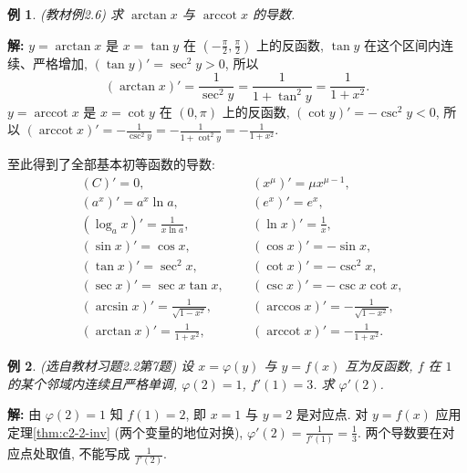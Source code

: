 \documentclass[UTF8,openany]{ctexbook}
\theoremstyle{chinesetextbook}
\newtheorem{example}{例}[section]
\newenvironment{cnsolution}{\par\indent\textbf{解:} \ignorespaces}{\par}
\begin{document}
\begin{example}\label{ex:c2-2-6}
\textnormal{(教材例2.6)} 求 $\arctan x$ 与 $\operatorname{arccot}x$ 的导数.
\end{example}
\begin{cnsolution}
$y=\arctan x$ 是 $x=\tan y$ 在 $\displaystyle\left(-\frac\pi2,\frac\pi2\right)$ 上的反函数, $\tan y$ 在这个区间内连续、严格增加, $(\tan y)'=\sec^2y>0$, 所以
\[
(\arctan x)'=\frac1{\sec^2y}=\frac1{1+\tan^2y}=\frac1{1+x^2}.
\]
$y=\operatorname{arccot}x$ 是 $x=\cot y$ 在 $(0,\pi)$ 上的反函数, $(\cot y)'=-\csc^2y<0$, 所以 $\displaystyle(\operatorname{arccot}x)'=-\frac1{\csc^2y}=-\frac1{1+\cot^2y}=-\frac1{1+x^2}$.
\end{cnsolution}
至此得到了全部基本初等函数的导数:
\[
\begin{aligned}
&(C)'=0, &&(x^\mu)'=\mu x^{\mu-1},\\
&(a^x)'=a^x\ln a, &&(e^x)'=e^x,\\
&(\log_ax)'=\frac1{x\ln a}, &&(\ln x)'=\frac1x,\\
&(\sin x)'=\cos x, &&(\cos x)'=-\sin x,\\
&(\tan x)'=\sec^2x, &&(\cot x)'=-\csc^2x,\\
&(\sec x)'=\sec x\tan x, &&(\csc x)'=-\csc x\cot x,\\
&(\arcsin x)'=\frac1{\sqrt{1-x^2}}, &&(\arccos x)'=-\frac1{\sqrt{1-x^2}},\\
&(\arctan x)'=\frac1{1+x^2},\qquad &&(\operatorname{arccot}x)'=-\frac1{1+x^2}.
\end{aligned}
\]
\begin{example}\label{ex:c2-h2-7}
\textnormal{(选自教材习题2.2第7题)} 设 $x=\varphi(y)$ 与 $y=f(x)$ 互为反函数, $f$ 在 $1$ 的某个邻域内连续且严格单调, $\varphi(2)=1$, $f'(1)=3$. 求 $\varphi'(2)$.
\end{example}
\begin{cnsolution}
由 $\varphi(2)=1$ 知 $f(1)=2$, 即 $x=1$ 与 $y=2$ 是对应点. 对 $y=f(x)$ 应用定理\ref{thm:c2-2-inv} (两个变量的地位对换), $\displaystyle\varphi'(2)=\frac1{f'(1)}=\frac13$. 两个导数要在对应点处取值, 不能写成 $\displaystyle\frac1{f'(2)}$.
\end{cnsolution}
\end{document}
